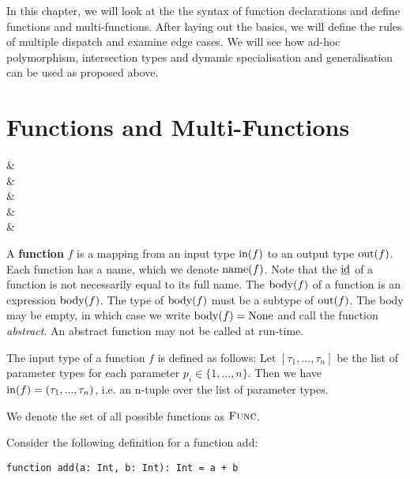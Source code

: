 \noindent In this chapter, we will look at the the syntax of function declarations and define functions and multi-functions. After laying out the basics, we will define the rules of multiple dispatch and examine edge cases. We will see how ad-hoc polymorphism, intersection types and dynamic specialisation and generalisation can be used as proposed above. 



\section{Functions and Multi-Functions}

\begin{grammar}
 &\produce {} \\
 &\produce {} \\
 &\produce {} \\
&\alt {} \\
 &\produce {}
\end{grammar}

\begin{definition}
	A \textbf{function} $f$ is a mapping from an input type $\operatorname{in}(f)$ to an output type $\operatorname{out}(f)$. Each function has a name, which we denote $\operatorname{name}(f)$. Note that the $\text{\underline{id}}$ of a function is not necessarily equal to its full name. The $\operatorname{body}(f)$ of a function is an expression $\operatorname{body}(f)$. The type of $\operatorname{body}(f)$ must be a subtype of $\operatorname{out}(f)$. The body may be empty, in which case we write $\operatorname{body}(f) = \text{None}$ and call the function \textit{abstract}. An abstract function may not be called at run-time.

	The input type of a function $f$ is defined as follows: Let $[\tau_1, ..., \tau_n]$ be the list of parameter types for each parameter $p_i \in \{ 1, ..., n \}$. Then we have $\operatorname{in}(f) = (\tau_1, ..., \tau_n)$, i.e. an n-tuple over the list of parameter types.

	We denote the set of all possible functions as $\textsc{Func}$.
\end{definition}

\noindent Consider the following definition for a function add:
\begin{lstlisting}
function add(a: Int, b: Int): Int = a + b
\end{lstlisting}
	
